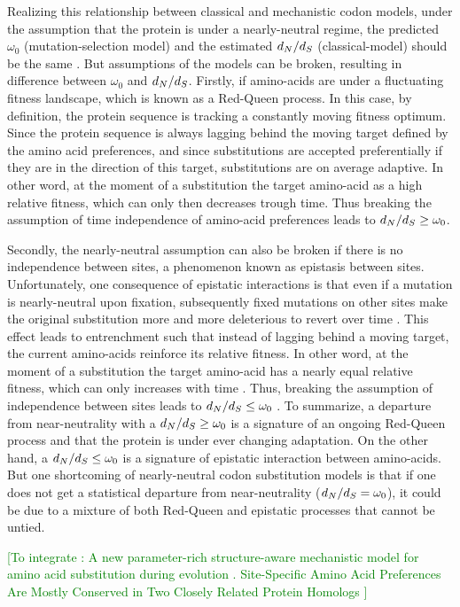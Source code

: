 Realizing this relationship between classical and mechanistic \gls{codon} models, under the assumption that the protein is under a \gls{nearly-neutral} regime, the predicted $\omega_0$ (mutation-selection model) and the estimated $d_N / d_S$ (classical-model) should be the same \citep{Spielman2015, Spielman2016}.
But assumptions of the models can be broken, resulting in difference between $\omega_0$ and $d_N / d_S$.
Firstly, if amino-acids are under a fluctuating fitness landscape, which is known as a Red-Queen process.
In this case, by definition, the protein sequence is tracking a constantly moving fitness optimum.
Since the protein sequence is always lagging behind the moving target defined by the amino acid preferences, and since \glspl{substitution} are accepted preferentially if they are in the direction of this target, \glspl{substitution} are on average adaptive.
In other word, at the moment of a \gls{substitution} the target amino-acid as a high relative fitness, which can only then decreases trough time.
Thus breaking the assumption of time independence of amino-acid preferences leads to $d_N / d_S \geq \omega_0$.

Secondly, the \gls{nearly-neutral} assumption can also be broken if there is no independence between sites, a phenomenon known as epistasis between sites.
Unfortunately, one consequence of epistatic interactions is that even if a mutation is \gls{nearly-neutral} upon fixation, subsequently fixed mutations on other sites make the original \gls{substitution} more and more deleterious to revert over time \citep{Gong2014, Lunzer2010, Mccandlish2013}.
This effect leads to entrenchment such that instead of lagging behind a moving target, the current amino-acids reinforce its relative fitness.
In other word, at the moment of a \gls{substitution} the target amino-acid has a nearly equal relative fitness, which can only increases with time \citep{Goldstein2016, Goldstein2017}.
Thus, breaking the assumption of independence between sites leads to $d_N / d_S \leq \omega_0$ \citep{Rodrigue2016}.
To summarize, a departure from near-neutrality with a $d_N / d_S \geq \omega_0$ is a signature of an ongoing Red-Queen process and that the protein is under ever changing adaptation.
On the other hand, a $d_N / d_S \leq \omega_0$ is a signature of epistatic interaction between amino-acids.
But one shortcoming of \gls{nearly-neutral} \gls{codon} \gls{substitution} models is that if one does not get a statistical departure from near-neutrality ($d_N / d_S = \omega_0$), it could be due to a mixture of both Red-Queen and epistatic processes that cannot be untied.

\textcolor{GREEN}{[To integrate :
A new parameter-rich structure-aware mechanistic model for amino acid {substitution} during evolution \citep{Chi2018}.
Site-Specific Amino Acid Preferences Are Mostly Conserved in Two Closely Related Protein Homologs \citep{Doud2015}]}

